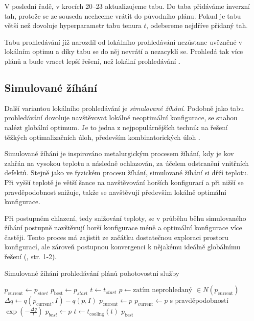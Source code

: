 V poslední řadě, v krocích 20--23 aktualizujeme tabu.
Do taba přidáváme inverzní tah, protože se ze souseda nechceme vrátit do původního plánu.
Pokud je tabu větší než dovoluje hyperparametr tabu tenura $t$, odebereme nejdříve přidaný tah.

Tabu prohledávání již narozdíl od lokálního prohledávání nezůstane uvězněné v lokálním optimu a díky tabu se do něj nevrátí a nezacyklí se.
Prohledá tak více plánů a bude vracet lepší řešení, než lokální prohledávání \cite{tabu}.

\subsection{Simulované žíhání}

Další variantou lokálního prohledávání je \textit{simulované žíhání}.
Podobně jako tabu prohledávání dovoluje navštěvovat lokálně neoptimální konfigurace, se snahou nalézt globální optimum.
Je to jedna z nejpopulárnějších technik na řešení těžkých optimalizačních úloh, především kombinatorických úloh \cite{siman}.

Simulované žíhání je inspirováno metalurgickým procesem žíhání, kdy je kov zahřán na vysokou teplotu
a následně ochlazován, za účelem odstranění vnitřních defektů.
Stejně jako ve fyzickém procesu žíhání, simulované žíhání si dřží teplotu.
Při vyšší teplotě je větší šance na navštěvování horších konfigurací a při nižší se pravděpodobnost snižuje, takže se navštěvují především lokálně optimální konfigurace.

Při postupném chlazení, tedy snižování teploty, se v průběhu běhu simulovaného žíhání postupně navštěvují horší konfigurace méně a optimální konfigurace více častěji.
Tento proces má zajistit ze začátku dostatečnou exploraci prostoru konfigurací, ale zároveň postupnou konvergenci k nějakému ideálně globálnímu řešení (\citet{GlovKoch03}, str. 1-2).

\begin{algorithm}[H]
  \caption{Simulované žíhání prohledávání plánů pohotovostní služby}
  \begin{algorithmic}[1]
    \State $p_{\text{current}} \gets p_{start}$
    \State $p_{\text{best}} \gets p_{start}$
    \State $t \gets t_{start}$
        \State $p \gets \text{zatím neprohledaný } \in N(p_{\text{current}})$
        \State $\Delta q \gets q(p_{\text{current}}, I) - q(p, I)$
          \State $p_{\text{current}} \gets p$
        \Else
          \State $p_{\text{current}} \gets p$ s pravděpodobností $\exp\left(-\frac{\Delta q}{t}\right)$
        \EndIf
          \State $p_{best} \gets p$
        \EndIf
      \EndFor
      \State $t \gets t_{\text{cooling}}(t)$
    \EndWhile
    \State \Return $p_{\text{best}}$
    \EndFunction
  \end{algorithmic}
  \label{alg:siman}
\end{algorithm}

